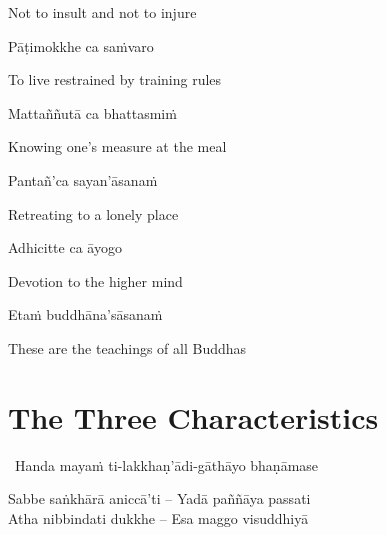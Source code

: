 \begin{english}
  Not to insult and not to injure
\end{english}

Pāṭimokkhe ca saṁvaro

\begin{english}
  To live restrained by training rules
\end{english}

Mattaññutā ca bhattasmiṁ

\begin{english}
  Knowing one's measure at the meal
\end{english}

Pantañ'ca sayan'āsanaṁ

\begin{english}
  Retreating to a lonely place
\end{english}

Adhicitte ca āyogo

\begin{english}
  Devotion to the higher mind
\end{english}

Etaṁ buddhāna'sāsanaṁ

\begin{english}
  These are the teachings of all Buddhas
\end{english}

\suttaRef{[Dhp 183-185]}


\section{The Three Characteristics}
\label{three-characteristics}

\begin{leader}
  \anglebracketleft\ \hspace{-0.5mm}Handa mayaṁ ti-lakkhaṇ'ādi-gāthāyo bhaṇāmase \hspace{-0.5mm}\anglebracketright\
\end{leader}

\begin{verses}
  Sabbe saṅkhārā aniccā'ti – Yadā paññāya passati\\
  Atha nibbindati dukkhe – Esa maggo visuddhiyā
\end{verses}

